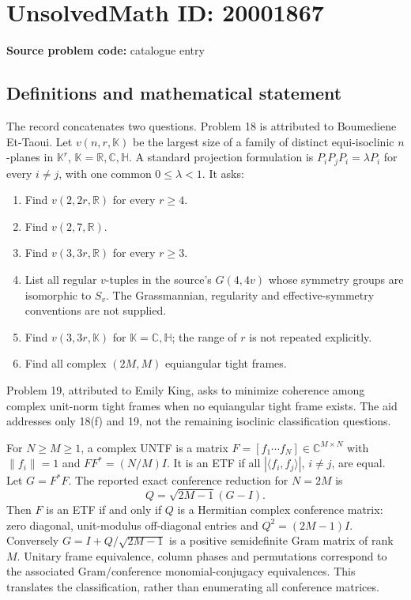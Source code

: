 \documentclass[11pt]{article}
\newcommand{\R}{\mathbb{R}}
\newcommand{\C}{\mathbb{C}}
\begin{document}
\section*{UnsolvedMath ID: 20001867}
\textbf{Source problem code:} catalogue entry
\subsection{Definitions and mathematical statement}
The record concatenates two questions. Problem 18 is attributed to Boumediene Et-Taoui. Let \(v(n,r,\mathbb K)\) be the largest size of a family of distinct equi-isoclinic \(n\)-planes in \(\mathbb K^r\), \(\mathbb K=\R,\C,\mathbb H\). A standard projection formulation is \(P_iP_jP_i=\lambda P_i\) for every \(i\ne j\), with one common \(0\leq\lambda<1\). It asks:
\begin{enumerate}
\item Find \(v(2,2r,\R)\) for every \(r\geq4\).
\item Find \(v(2,7,\R)\).
\item Find \(v(3,3r,\R)\) for every \(r\geq3\).
\item List all regular \(v\)-tuples in the source's \(G(4,4v)\) whose symmetry groups are isomorphic to \(S_v\). The Grassmannian, regularity and effective-symmetry conventions are not supplied.
\item Find \(v(3,3r,\mathbb K)\) for \(\mathbb K=\C,\mathbb H\); the range of \(r\) is not repeated explicitly.
\item Find all complex \((2M,M)\) equiangular tight frames.
\end{enumerate}
Problem 19, attributed to Emily King, asks to minimize coherence among complex unit-norm tight frames when no equiangular tight frame exists. The aid addresses only 18(f) and 19, not the remaining isoclinic classification questions.

For \(N\geq M\geq1\), a complex UNTF is a matrix \(F=[f_1\cdots f_N]\in\C^{M\times N}\) with \(\|f_i\|=1\) and \(FF^*=(N/M)I\). It is an ETF if all \(|\langle f_i,f_j\rangle|\), \(i\ne j\), are equal. Let \(G=F^*F\). The reported exact conference reduction for \(N=2M\) is
\[
 Q=\sqrt{2M-1}(G-I).
\]
Then \(F\) is an ETF if and only if \(Q\) is a Hermitian complex conference matrix: zero diagonal, unit-modulus off-diagonal entries and \(Q^2=(2M-1)I\). Conversely \(G=I+Q/\sqrt{2M-1}\) is a positive semidefinite Gram matrix of rank \(M\). Unitary frame equivalence, column phases and permutations correspond to the associated Gram/conference monomial-conjugacy equivalences. This translates the classification, rather than enumerating all conference matrices.
\end{document}
